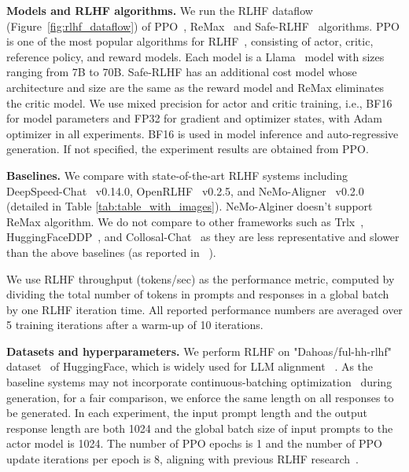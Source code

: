 \noindent\textbf{Models and RLHF algorithms.}
We %
run the RLHF dataflow (Figure~\ref{fig:rlhf_dataflow}) of PPO~\cite{schulman2017proximal}, ReMax~\cite{li2023remax} and Safe-RLHF~\cite{daiSafeRLHFSafe2023} algorithms.
PPO is one of the most popular %
algorithms for RLHF~\cite{bai2022training, ouyang2022training}, consisting of %
actor, critic, reference policy, and reward models. Each model is a Llama~\cite{touvron2023llama} model with sizes ranging from 7B to 70B. 
Safe-RLHF has an additional cost model whose architecture and size are the same as the reward model and ReMax eliminates the critic model. 
We use mixed precision for actor and critic training, i.e., BF16 for model parameters and FP32 for gradient and optimizer states, with Adam~\cite{kingma2017adam} optimizer in all experiments. 
BF16 is used in model inference and auto-regressive generation.
If not specified, the experiment results are obtained from PPO.








\noindent\textbf{Baselines.}
We compare \sysname{} with state-of-the-art RLHF systems including DeepSpeed-Chat~\cite{yao2023deepspeedchat} v0.14.0, OpenRLHF~\cite{hu23openrlhf} v0.2.5, and NeMo-Aligner~\cite{NeMoAligner} v0.2.0 (detailed in Table \ref{tab:table_with_images}). 
NeMo-Alginer doesn't support ReMax algorithm.
We do not compare \sysname{} to other frameworks such as Trlx~\cite{havrilla2023trlx}, HuggingFaceDDP~\cite{wolf2019huggingfaces}, and Collosal-Chat~\cite{CollosalChat} as they are less representative and slower than the above baselines (as reported in ~\cite{yao2023deepspeedchat}). 

We use RLHF %
throughput (tokens/sec) as the performance metric, computed by dividing the total number of tokens in prompts and responses in a global batch by one RLHF iteration time.
All reported performance %
numbers are averaged over 5 training iterations after a warm-up of 10 iterations.

\noindent\textbf{Datasets and hyperparameters.}
We perform RLHF on "Dahoas/ful-hh-rlhf" dataset~\cite{bai2022training} of HuggingFace, which is widely used for LLM alignment%
~\cite{yuan2023rrhf, santacroce2023efficient-rlhf}. %
As the baseline systems may not incorporate continuous-batching optimization~\cite{yu2022orca} during generation, for a fair comparison, we enforce the same length on all responses to be generated. In each experiment, the input prompt length and the output response length are both 1024 and the global batch size of input prompts to the actor model is 1024.
The number of PPO epochs is 1 and the number of PPO update iterations per epoch is 8, aligning with previous RLHF research~\cite{ouyang2022training, huang2024n+, xu2024dpo}.





